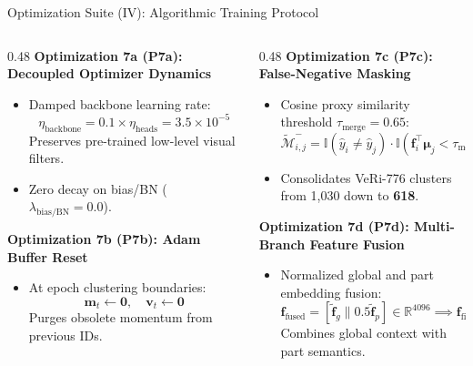 \documentclass[aspectratio=169,xcolor=dvipsnames]{beamer}
\begin{document}
\begin{frame}{Optimization Suite (IV): Algorithmic Training Protocol}
\footnotesize
\begin{columns}[t,onlytextwidth]
\begin{column}{0.48\textwidth}
    \textbf{Optimization 7a (P7a): Decoupled Optimizer Dynamics}
    \begin{itemize}
        \setlength{\itemsep}{0.12em}
        \item Damped backbone learning rate:
        $$\eta_{\text{backbone}} = 0.1 \times \eta_{\text{heads}} = 3.5 \times 10^{-5}$$
        Preserves pre-trained low-level visual filters.
        \item Zero decay on bias/BN ($\lambda_{\text{bias/BN}} = 0.0$).
    \end{itemize}
    \vspace{0.2em}
    \textbf{Optimization 7b (P7b): Adam Buffer Reset}
    \begin{itemize}
        \setlength{\itemsep}{0.12em}
        \item At epoch clustering boundaries:
        $$\mathbf{m}_t \leftarrow \mathbf{0}, \quad \mathbf{v}_t \leftarrow \mathbf{0}$$
        Purges obsolete momentum from previous IDs.
    \end{itemize}
\end{column}
\begin{column}{0.48\textwidth}
    \textbf{Optimization 7c (P7c): False-Negative Masking}
    \begin{itemize}
        \setlength{\itemsep}{0.12em}
        \item Cosine proxy similarity threshold $\tau_{\text{merge}} = 0.65$:
        $$\widetilde{\mathcal{M}}_{i, j}^- = \mathbb{I}(\hat{y}_i \neq \hat{y}_j) \cdot \mathbb{I}(\mathbf{f}_i^\top \boldsymbol{\mu}_j < \tau_{\text{merge}})$$
        \item Consolidates VeRi-776 clusters from 1,030 down to \textbf{618}.
    \end{itemize}
    \vspace{0.2em}
    \textbf{Optimization 7d (P7d): Multi-Branch Feature Fusion}
    \begin{itemize}
        \setlength{\itemsep}{0.12em}
        \item Normalized global and part embedding fusion:
        $$\mathbf{f}_{\text{fused}} = [\tilde{\mathbf{f}}_g \parallel 0.5 \tilde{\mathbf{f}}_p] \in \mathbb{R}^{4096} \implies \mathbf{f}_{\text{final}} \in \mathbb{S}^{4095}$$
        Combines global context with part semantics.
    \end{itemize}
\end{column}
\end{columns}
\end{frame}
\end{document}
